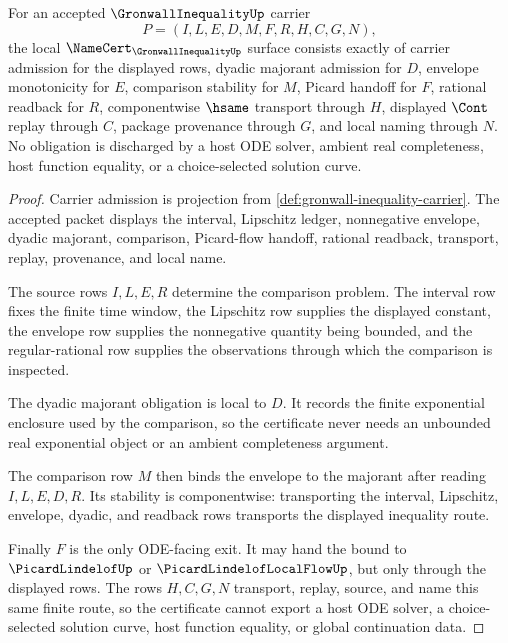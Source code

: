 \begin{theorem}
\label{thm:gronwall-inequality-namecert-obligations}
For an accepted $\GronwallInequalityUp$ carrier
$$
P=(I,L,E,D,M,F,R,H,C,G,N),
$$
the local $\NameCert_{\GronwallInequalityUp}$ surface consists exactly of carrier admission for the displayed rows, dyadic majorant admission for $D$, envelope monotonicity for $E$, comparison stability for $M$, Picard handoff for $F$, rational readback for $R$, componentwise $\hsame$ transport through $H$, displayed $\Cont$ replay through $C$, package provenance through $G$, and local naming through $N$. No obligation is discharged by a host ODE solver, ambient real completeness, host function equality, or a choice-selected solution curve.
\end{theorem}
\begin{proof}
Carrier admission is projection from \autoref{def:gronwall-inequality-carrier}. The accepted packet displays the interval, Lipschitz ledger, nonnegative envelope, dyadic majorant, comparison, Picard-flow handoff, rational readback, transport, replay, provenance, and local name.

The source rows $I,L,E,R$ determine the comparison problem. The interval row fixes the finite time window, the Lipschitz row supplies the displayed constant, the envelope row supplies the nonnegative quantity being bounded, and the regular-rational row supplies the observations through which the comparison is inspected.

The dyadic majorant obligation is local to $D$. It records the finite exponential enclosure used by the comparison, so the certificate never needs an unbounded real exponential object or an ambient completeness argument.

The comparison row $M$ then binds the envelope to the majorant after reading $I,L,E,D,R$. Its stability is componentwise: transporting the interval, Lipschitz, envelope, dyadic, and readback rows transports the displayed inequality route.

Finally $F$ is the only ODE-facing exit. It may hand the bound to $\PicardLindelofUp$ or $\PicardLindelofLocalFlowUp$, but only through the displayed rows. The rows $H,C,G,N$ transport, replay, source, and name this same finite route, so the certificate cannot export a host ODE solver, a choice-selected solution curve, host function equality, or global continuation data.
\end{proof}

